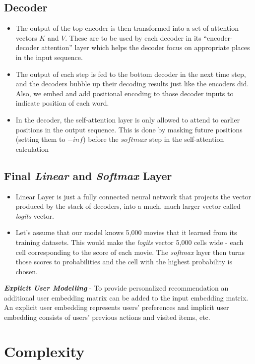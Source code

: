 \documentclass[11pt]{article}
\begin{document}
\subsection{Decoder}
\begin{itemize}
\item The output of the top encoder is then transformed into a set of attention vectors $K$ and $V$. These are to be used by each decoder in its “encoder-decoder attention” layer which helps the decoder focus on appropriate places in the input sequence.
\item The output of each step is fed to the bottom decoder in the next time step, and the decoders bubble up their decoding results just like the encoders did. Also, we embed and add positional encoding to those decoder inputs to indicate position of each word.
\item In the decoder, the self-attention layer is only allowed to attend to earlier positions in the output sequence. This is done by masking future positions (setting them to $-inf$) before the $softmax$ step in the self-attention calculation
\end{itemize}

\subsection{Final \emph{Linear} and \emph{Softmax} Layer}
\begin{itemize}
\item Linear Layer is just a fully connected neural network that projects the vector produced by the stack of decoders, into a much, much larger vector called \textit{logits} vector.
\item 	Let’s assume that our model knows 5,000 movies that it learned from its training datasets. This would make the \textit{logits} vector 5,000 cells wide - each cell corresponding to the score of each movie. The \textit{softmax} layer then turns those scores to probabilities and the cell with the highest probability is chosen.

\end{itemize}

\textbf{\textit{Explicit User Modelling}} - 
	To provide personalized recommendation an additional user embedding matrix can be added to the input embedding matrix. An explicit user embedding represents users’ preferences and implicit user embedding consists of users’ previous actions and visited items, etc.   


\section{Complexity}
\end{document}
